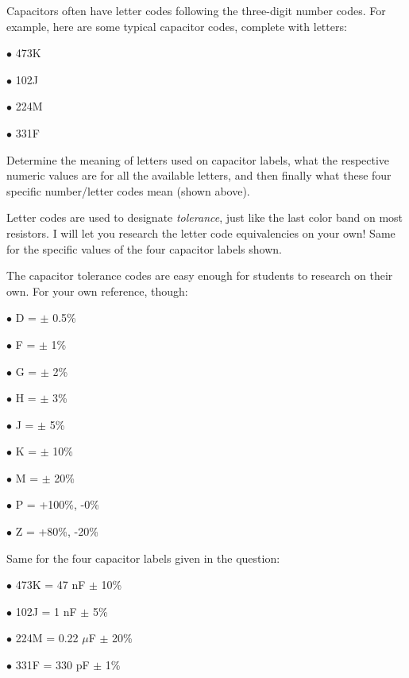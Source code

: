 

Capacitors often have letter codes following the three-digit number codes.  For example, here are some typical capacitor codes, complete with letters:

\medskip
\item{$\bullet$} 473K
\item{$\bullet$} 102J
\item{$\bullet$} 224M
\item{$\bullet$} 331F
\medskip

Determine the meaning of letters used on capacitor labels, what the respective numeric values are for all the available letters, and then finally what these four specific number/letter codes mean (shown above).







Letter codes are used to designate {\it tolerance}, just like the last color band on most resistors.  I will let you research the letter code equivalencies on your own!  Same for the specific values of the four capacitor labels shown.







The capacitor tolerance codes are easy enough for students to research on their own.  For your own reference, though:

\medskip
\item{$\bullet$} D = $\pm$ 0.5\%
\item{$\bullet$} F = $\pm$ 1\%
\item{$\bullet$} G = $\pm$ 2\%
\item{$\bullet$} H = $\pm$ 3\%
\item{$\bullet$} J = $\pm$ 5\%
\item{$\bullet$} K = $\pm$ 10\%
\item{$\bullet$} M = $\pm$ 20\%
\item{$\bullet$} P = +100\%, -0\%
\item{$\bullet$} Z = +80\%, -20\%
\medskip

Same for the four capacitor labels given in the question:

\medskip
\item{$\bullet$} 473K = 47 nF $\pm$ 10\%
\item{$\bullet$} 102J = 1 nF $\pm$ 5\%
\item{$\bullet$} 224M = 0.22 $\mu$F $\pm$ 20\%
\item{$\bullet$} 331F = 330 pF $\pm$ 1\%
\medskip




